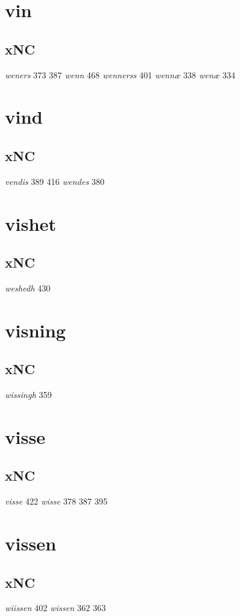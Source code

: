 \documentclass[a4paper,twocolumn]{article}
\begin{document}
\section{vin}
\label{sec:org3a1ff27}
\subsection{xNC}
\label{sec:org5306762}
\emph{weners} 373 387 \emph{wenn} 468 \emph{wennerss} 401 \emph{wennæ} 338 \emph{wenæ} 334 
\section{vind}
\label{sec:orga3c2427}
\subsection{xNC}
\label{sec:orge61f98a}
\emph{vendis} 389 416 \emph{wendes} 380 
\section{vishet}
\label{sec:org5358025}
\subsection{xNC}
\label{sec:orga04a353}
\emph{weshedh} 430 
\section{visning}
\label{sec:org94944b3}
\subsection{xNC}
\label{sec:org6382a0f}
\emph{wissingh} 359 
\section{visse}
\label{sec:orga92398a}
\subsection{xNC}
\label{sec:org4887207}
\emph{visse} 422 \emph{wisse} 378 387 395 
\section{vissen}
\label{sec:org2519c6c}
\subsection{xNC}
\label{sec:org8339ae9}
\emph{wiissen} 402 \emph{wissen} 362 363 
\end{document}
